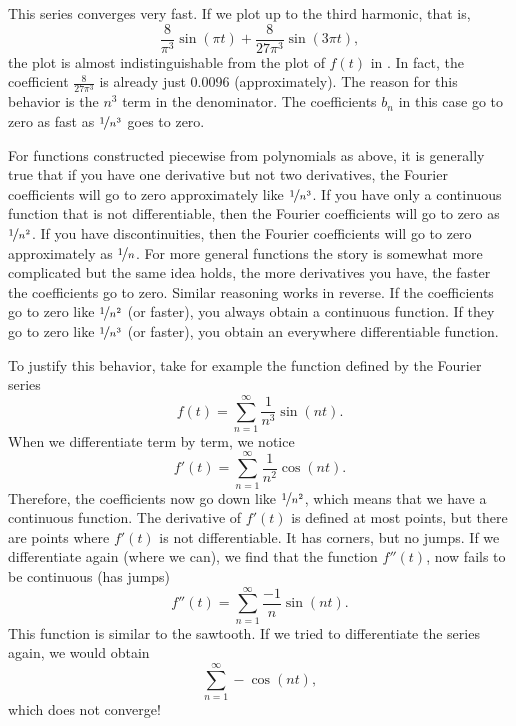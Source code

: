 \begin{example}
This series converges very fast.
If we plot up
to the third harmonic, that is,
\begin{equation*}
\frac{8}{\pi^3} \sin (\pi t) + 
\frac{8}{27 \pi^3} \sin (3 \pi t) ,
\end{equation*}
the plot is almost indistinguishable from the plot of $f(t)$ in
.
In fact, the coefficient 
$\frac{8}{27 \pi^3}$ is already just 0.0096 (approximately).
The reason for this behavior is the $n^3$ term in the denominator.
The coefficients $b_n$ in this case go to zero as fast as
$\nicefrac{1}{n^3}$ goes to
zero.
\end{example}

For functions constructed piecewise from polynomials as above,
it is generally true that
if you have one derivative but not two derivatives,
the Fourier
coefficients will go to zero approximately like $\nicefrac{1}{n^3}$.
If you
have only a continuous function that is not differentiable,
then the Fourier coefficients will go to
zero as $\nicefrac{1}{n^2}$.  If you have discontinuities, then 
the Fourier coefficients will go to zero approximately as $\nicefrac{1}{n}$.
For more general functions the story is somewhat more complicated but the
same idea holds, the more derivatives you have, the faster the coefficients
go to zero.  Similar reasoning works in reverse.  If the coefficients go to
zero like $\nicefrac{1}{n^2}$ (or faster),
you always obtain a continuous function.  If
they go to zero like $\nicefrac{1}{n^3}$ (or faster),
you obtain an everywhere differentiable
function.

To justify this behavior, take for example the function defined by
the Fourier series
\begin{equation*}
f(t) = \sum_{n=1}^\infty \frac{1}{n^3} \sin (n t) .
\end{equation*}
When we differentiate term by term, we notice
\begin{equation*}
f'(t) = \sum_{n=1}^\infty \frac{1}{n^2} \cos (n t) .
\end{equation*}
Therefore, the coefficients now go down like $\nicefrac{1}{n^2}$, which 
means that we have a continuous function.
The derivative 
of $f'(t)$ is defined
at most points, but there are points where $f'(t)$ is not differentiable.
It has corners, but no jumps.
If we
differentiate again (where we can), we find that the function
$f''(t)$,
now fails to be continuous (has jumps)
\begin{equation*}
f''(t) = \sum_{n=1}^\infty \frac{-1}{n} \sin (n t) .
\end{equation*}
This function is similar to the sawtooth.  If we tried to differentiate
the series again, we would obtain
\begin{equation*}
\sum_{n=1}^\infty -\cos (n t) ,
\end{equation*}
which does not converge!

